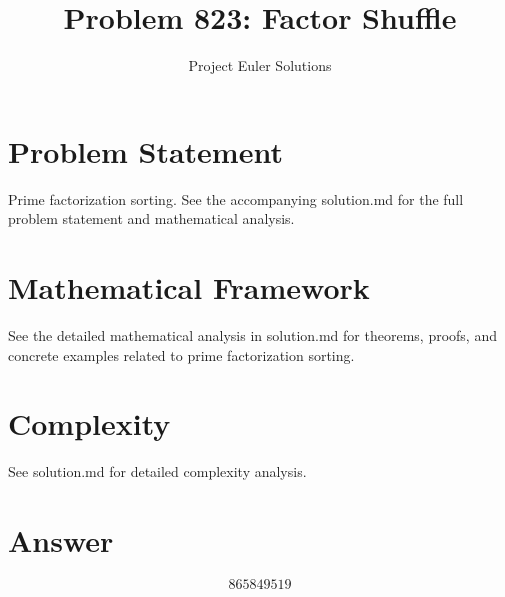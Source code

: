 \documentclass[11pt]{article}
\title{Problem 823: Factor Shuffle}
\author{Project Euler Solutions}
\date{}
\begin{document}
\maketitle

\section{Problem Statement}

Prime factorization sorting. See the accompanying solution.md for the full problem statement and mathematical analysis.

\section{Mathematical Framework}

See the detailed mathematical analysis in solution.md for theorems, proofs, and concrete examples related to prime factorization sorting.

\section{Complexity}

See solution.md for detailed complexity analysis.

\section{Answer}

\[
\boxed{865849519}
\]
\end{document}
